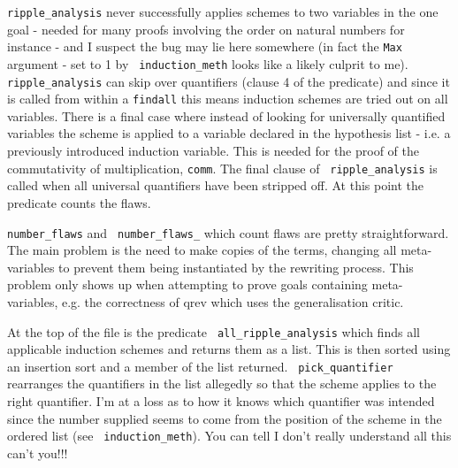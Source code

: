 \begin{description}
  {\tt ripple\_analysis} never successfully applies schemes to two
  variables in the one goal - needed for many proofs involving the
  order on natural numbers for
  instance - and I suspect the bug may lie here somewhere (in fact the
  {\tt Max} argument - set to 1 by {\tt
    induction\_meth} looks like a likely
  culprit to me).  {\tt ripple\_analysis} can skip over quantifiers
  (clause 4 of the predicate) and since it is called from within a
  {\tt findall} this means induction schemes are tried
  out on all variables.  There is a final case where instead of
  looking for universally quantified variables the scheme is applied
  to a variable declared in the hypothesis list - i.e. a previously
  introduced induction variable.  This is needed for the proof of the
  commutativity of multiplication, {\tt comm}.  The final clause of {\tt
    ripple\_analysis} is called when all universal quantifiers have
  been stripped off.  At this point the predicate counts the flaws.
  
  {\tt number\_flaws} and {\tt
    number\_flaws\_} which count
  flaws are pretty straightforward.  The main problem is
  the need to make copies of the terms, changing all meta-variables to
  prevent them being instantiated by the rewriting
  process.  This problem only shows up when attempting to prove goals
  containing meta-variables, e.g. the correctness
  of qrev which uses the generalisation
  critic.
  
  At the top of the file is the predicate {\tt
    all\_ripple\_analysis} which finds
  all applicable induction schemes and returns
  them as a list.  This is then sorted using an insertion sort and a
  member of the list returned.  {\tt
    pick\_quantifier} rearranges the
  quantifiers in the list allegedly so that the scheme applies to the
  right quantifier.  I'm at a loss as to how it knows which quantifier
  was intended since the number supplied seems to come from the
  position of the scheme in the ordered list (see {\tt
    induction\_meth}).  You can tell I don't
  really understand all this can't you!!!
  

\end{description}
